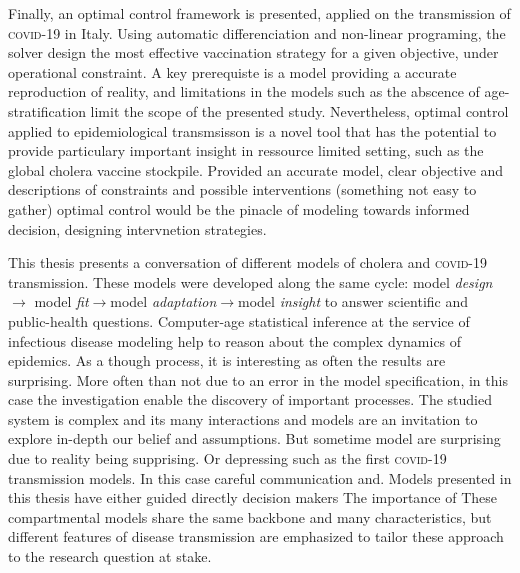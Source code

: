 Finally, an optimal control framework is presented, applied on the transmission of \textsc{covid}-19 in Italy. Using automatic differenciation and non-linear programing, the solver design the most effective vaccination strategy for a given objective, under operational constraint. A key prerequiste is a model providing a accurate reproduction of reality, and limitations in the models such as the abscence of age-stratification limit the scope of the presented study. Nevertheless, optimal control applied to epidemiological transmsisson is a novel tool that has the potential to provide particulary important  insight in ressource limited setting, such as the global cholera vaccine stockpile. Provided an accurate model, clear objective and descriptions of constraints and possible interventions (something not easy to gather) optimal control would be the pinacle of modeling towards informed decision, designing intervnetion strategies.

This thesis presents a conversation of different models of cholera and \textsc{covid}-19 transmission. These models were developed along the same cycle: model \textit{design}$\rightarrow$ model \textit{fit}$\rightarrow$model \textit{adaptation}$\rightarrow$model \textit{insight} to answer scientific and public-health questions. Computer-age statistical inference at the service of infectious disease modeling help to reason about the complex dynamics of epidemics. 
As a though process, it is interesting as often the results are surprising. More often than not due to an error in the model specification, in this case the investigation enable the discovery of important processes. The studied system is complex and its many interactions and models are an invitation to explore in-depth our belief and assumptions. But sometime model are surprising due to reality being supprising. Or depressing such as the first \textsc{covid}-19 transmission models. In this case careful communication and. Models presented in this thesis have either guided directly decision makers
The importance of  These compartmental models share the same backbone and many characteristics, but different features of disease transmission are emphasized to tailor these approach to the research question at stake. %

